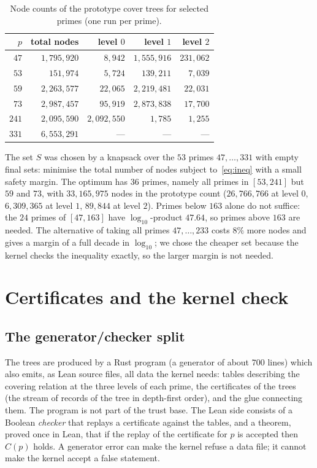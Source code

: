 \documentclass[11pt]{article}
\theoremstyle{remark}
\begin{document}
\begin{table}[ht]
\centering\small
\begin{tabular}{rrrrr}
\toprule
$p$ & total nodes & level $0$ & level $1$ & level $2$\\
\midrule
$47$ & $1{,}795{,}920$ & $8{,}942$ & $1{,}555{,}916$ & $231{,}062$\\
$53$ & $151{,}974$ & $5{,}724$ & $139{,}211$ & $7{,}039$\\
$59$ & $2{,}263{,}577$ & $22{,}065$ & $2{,}219{,}481$ & $22{,}031$\\
$73$ & $2{,}987{,}457$ & $95{,}919$ & $2{,}873{,}838$ & $17{,}700$\\
$241$ & $2{,}095{,}590$ & $2{,}092{,}550$ & $1{,}785$ & $1{,}255$\\
$331$ & $6{,}553{,}291$ & --- & --- & ---\\
\bottomrule
\end{tabular}
\caption{Node counts of the prototype cover trees for selected primes (one run per prime).}\label{tab:cost}
\end{table}

The set $S$ was chosen by a knapsack over the $53$ primes $47,\dots,331$ with empty final sets: minimise the total number of nodes subject to~\eqref{eq:ineq} with a small safety margin. The optimum has $36$ primes, namely all primes in $[53,241]$ but $59$ and $73$, with $33{,}165{,}975$ nodes in the prototype count ($26{,}766{,}766$ at level $0$, $6{,}309{,}365$ at level $1$, $89{,}844$ at level $2$). Primes below $163$ alone do not suffice: the $24$ primes of $[47,163]$ have $\log_{10}$-product $47.64$, so primes above $163$ are needed. The alternative of taking all primes $47,\dots,233$ costs $8\%$ more nodes and gives a margin of a full decade in $\log_{10}$; we chose the cheaper set because the kernel checks the inequality exactly, so the larger margin is not needed.

\section{Certificates and the kernel check}\label{sec:cert}

\subsection{The generator/checker split}

The trees are produced by a Rust program (a generator of about $700$ lines) which also emits, as Lean source files, all data the kernel needs: tables describing the covering relation at the three levels of each prime, the certificates of the trees (the stream of records of the tree in depth-first order), and the glue connecting them. The program is not part of the trust base. The Lean side consists of a Boolean \emph{checker} that replays a certificate against the tables, and a theorem, proved once in Lean, that if the replay of the certificate for $p$ is accepted then $C(p)$ holds. A generator error can make the kernel refuse a data file; it cannot make the kernel accept a false statement.
\end{document}
